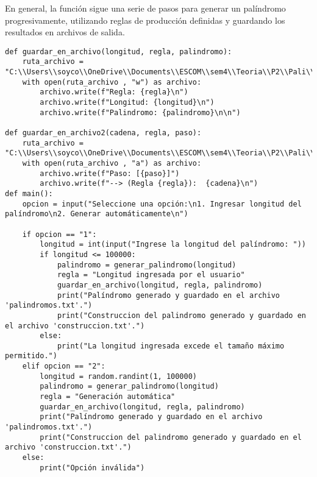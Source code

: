 En general, la función sigue una serie de pasos para generar un palíndromo progresivamente, utilizando reglas de producción definidas y guardando los resultados en archivos de salida.\newline
\newpage
\begin{lstlisting}
def guardar_en_archivo(longitud, regla, palindromo):
    ruta_archivo = "C:\\Users\\soyco\\OneDrive\\Documents\\ESCOM\\sem4\\Teoria\\P2\\Pali\\output\\palindromos.txt"
    with open(ruta_archivo , "w") as archivo:
        archivo.write(f"Regla: {regla}\n")
        archivo.write(f"Longitud: {longitud}\n")
        archivo.write(f"Palindromo: {palindromo}\n\n")
        
def guardar_en_archivo2(cadena, regla, paso):
    ruta_archivo = "C:\\Users\\soyco\\OneDrive\\Documents\\ESCOM\\sem4\\Teoria\\P2\\Pali\\output\\construccion.txt"
    with open(ruta_archivo , "a") as archivo:     
        archivo.write(f"Paso: [{paso}]")
        archivo.write(f"--> (Regla {regla}):  {cadena}\n")
def main():
    opcion = input("Seleccione una opción:\n1. Ingresar longitud del palíndromo\n2. Generar automáticamente\n")
    
    if opcion == "1":
        longitud = int(input("Ingrese la longitud del palíndromo: "))
        if longitud <= 100000:
            palindromo = generar_palindromo(longitud)
            regla = "Longitud ingresada por el usuario"
            guardar_en_archivo(longitud, regla, palindromo)
            print("Palíndromo generado y guardado en el archivo 'palindromos.txt'.")
            print("Construccion del palindromo generado y guardado en el archivo 'construccion.txt'.")
        else:
            print("La longitud ingresada excede el tamaño máximo permitido.")
    elif opcion == "2":
        longitud = random.randint(1, 100000)
        palindromo = generar_palindromo(longitud)
        regla = "Generación automática"
        guardar_en_archivo(longitud, regla, palindromo)
        print("Palíndromo generado y guardado en el archivo 'palindromos.txt'.")
        print("Construccion del palindromo generado y guardado en el archivo 'construccion.txt'.")
    else:
        print("Opción inválida")
\end{lstlisting}

